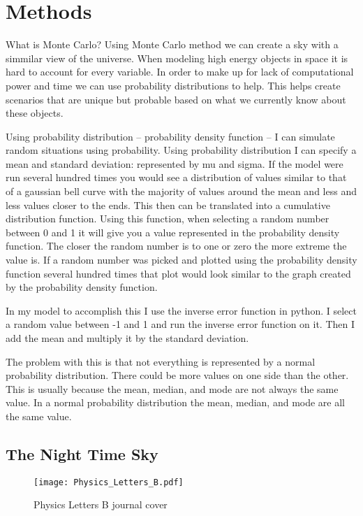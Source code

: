 \documentclass[final,5p,times,twocolumn,authoryear]{elsarticle}
\begin{document}
\section{Methods}
What is Monte Carlo?
Using Monte Carlo method we can create a sky with a simmilar view of the universe.
When modeling high energy objects in space it is hard to account for every variable. In order to make up for lack of computational power and time we can use probability distributions to help. This helps create scenarios that are unique but probable based on what we currently know about these objects. 

Using probability distribution – probability density function – I can simulate random situations using probability. Using probability distribution I can specify a mean and standard deviation: represented by mu and sigma. If the model were run several hundred times you would see a distribution of values similar to that of a gaussian bell curve with the majority of values around the mean and less and less values closer to the ends. This then can be translated into a cumulative distribution function. Using this function, when selecting a random number between 0 and 1 it will give you a value represented in the probability density function. The closer the random number is to one or zero the more extreme the value is. If a random number was picked and plotted using the probability density function several hundred times that plot would look similar to the graph created by the probability density function.

        In my model to accomplish this I use the inverse error function in python. I select a random value between -1 and 1 and run the inverse error function on it. Then I add the mean and multiply it by the standard deviation.
        
The problem with this is that not everything is represented by a normal probability distribution. There could be more values on one side than the other. This is usually because the mean, median, and mode are not always the same value. In a normal probability distribution the mean, median, and mode are all the same value. 


\subsection{The Night Time Sky}

\begin{figure}
	\centering 
	\texttt{[image: Physics\_Letters\_B.pdf]}	
	\caption{Physics Letters B journal cover} 
	\label{fig_mom0}%
\end{figure}
\end{document}
